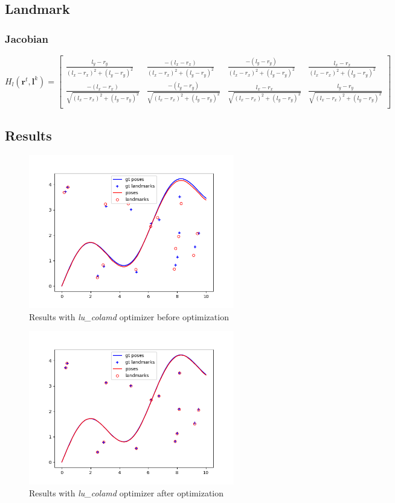 \documentclass[12pt, a4paper]{article}
\begin{document}
\subsection{Landmark}
\subsubsection{Jacobian}
\[H_l(\mathbf{r}^t, \mathbf{l}^{k}) = \begin{bmatrix}
  \frac{l_y - r_y}{(l_x - r_x)^2 + (l_y - r_y)^2} & \frac{-(l_x - r_x)}{(l_x - r_x)^2 + (l_y - r_y)^2} & \frac{-(l_y - r_y)}{(l_x - r_x)^2 + (l_y - r_y)^2} & \frac{l_x - r_x}{(l_x - r_x)^2 + (l_y - r_y)^2}\\
  \frac{-(l_x - r_x)}{\sqrt{(l_x - r_x)^2 + (l_y - r_y)^2}} & \frac{-(l_y - r_y)}{\sqrt{(l_x - r_x)^2 + (l_y - r_y)^2}} & \frac{l_x - r_x}{\sqrt{(l_x - r_x)^2 + (l_y - r_y)^2}} & \frac{l_y - r_y}{\sqrt{(l_x - r_x)^2 + (l_y - r_y)^2}}\\
\end{bmatrix}\]

\subsection{Results}
\begin{figure}[H]
  \centering
  \includegraphics[width=0.8\textwidth]{./results/nonlinear/lu_colamd_2d_nonlinear_map_before.png}
  \caption{Results with \textit{lu\_colamd} optimizer before optimization}
\end{figure}
\begin{figure}[H]
  \centering
  \includegraphics[width=0.8\textwidth]{./results/nonlinear/lu_colamd_2d_nonlinear_map_after.png}
  \caption{Results with \textit{lu\_colamd} optimizer after optimization}
\end{figure}
\end{document}
